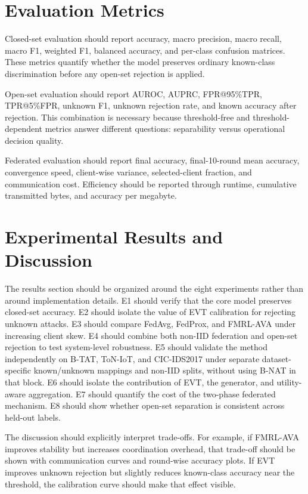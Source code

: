 \documentclass[10pt,twocolumn]{article}
\begin{document}
\section{Evaluation Metrics}
Closed-set evaluation should report accuracy, macro precision, macro recall, macro F1, weighted F1, balanced accuracy, and per-class confusion matrices. These metrics quantify whether the model preserves ordinary known-class discrimination before any open-set rejection is applied.

Open-set evaluation should report AUROC, AUPRC, FPR@95\%TPR, TPR@5\%FPR, unknown F1, unknown rejection rate, and known accuracy after rejection. This combination is necessary because threshold-free and threshold-dependent metrics answer different questions: separability versus operational decision quality.

Federated evaluation should report final accuracy, final-10-round mean accuracy, convergence speed, client-wise variance, selected-client fraction, and communication cost. Efficiency should be reported through runtime, cumulative transmitted bytes, and accuracy per megabyte.

\section{Experimental Results and Discussion}
The results section should be organized around the eight experiments rather than around implementation details. E1 should verify that the core model preserves closed-set accuracy. E2 should isolate the value of EVT calibration for rejecting unknown attacks. E3 should compare FedAvg, FedProx, and FMRL-AVA under increasing client skew. E4 should combine both non-IID federation and open-set rejection to test system-level robustness. E5 should validate the method independently on B-TAT, ToN-IoT, and CIC-IDS2017 under separate dataset-specific known/unknown mappings and non-IID splits, without using B-NAT in that block. E6 should isolate the contribution of EVT, the generator, and utility-aware aggregation. E7 should quantify the cost of the two-phase federated mechanism. E8 should show whether open-set separation is consistent across held-out labels.

The discussion should explicitly interpret trade-offs. For example, if FMRL-AVA improves stability but increases coordination overhead, that trade-off should be shown with communication curves and round-wise accuracy plots. If EVT improves unknown rejection but slightly reduces known-class accuracy near the threshold, the calibration curve should make that effect visible.
\end{document}
